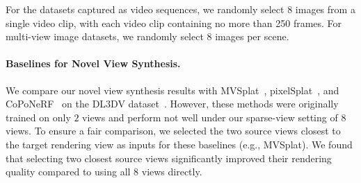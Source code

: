 % 
% 
For the datasets captured as video sequences, we randomly select $8$ images from a single video clip, with each video clip containing no more than 250 frames. 
% 
For multi-view image datasets, we randomly select $8$ images per scene. 
% 


\paragraph{Baselines for Novel View Synthesis.}
We compare our novel view synthesis results with MVSplat~\cite{chen2024mvsplat}, pixelSplat~\cite{charatan2024pixelsplat}, and CoPoNeRF~\cite{hong2023unifying} on the DL3DV dataset~\cite{Ling_2024_CVPR}.
% 
% 
However, these methods were originally trained on only $2$ views and perform not well under our sparse-view setting of $8$ views. To ensure a fair comparison, we selected the two source views closest to the target rendering view as inputs for these baselines (e.g., MVSplat). 
% 
We found that selecting two closest source views significantly improved their rendering quality compared to using all $8$ views directly.
% 





